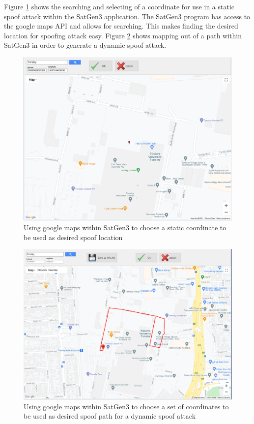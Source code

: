 Figure \ref{fig:StaticCoordinate} shows the searching and selecting of a coordinate for use in a static spoof attack within the SatGen3 application. The
SatGen3 program has access to the google maps API and allows for searching. This makes finding the desired location for spoofing attack easy. 
Figure \ref{fig:DynamicCoordinate} shows mapping out of a path within SatGen3 in order to generate a dynamic spoof attack.

\begin{figure}
    \begin{centering}
        \includegraphics[width=12cm,keepaspectratio]{Figures/static coordinates setup.png}
        \caption{Using google maps within SatGen3 to choose a static coordinate to be used as desired spoof location}
    \label{fig:StaticCoordinate}
    \end{centering}
\end{figure}

\begin{figure}[ht]
    \begin{centering}
        \includegraphics[width=12cm,keepaspectratio]{Figures/dynamic coordinates setup.png}
        \caption{Using google maps within SatGen3 to choose a set of coordinates to be used as desired spoof path for a dynamic spoof attack}
    \label{fig:DynamicCoordinate}
    \end{centering}
\end{figure}

